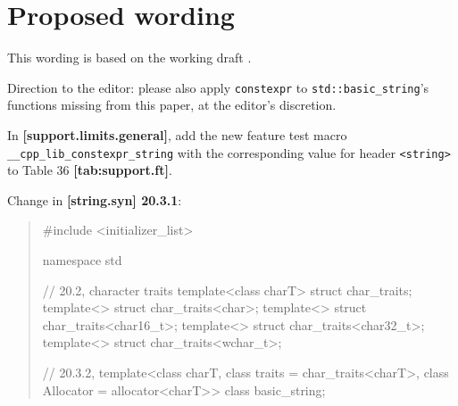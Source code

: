 \documentclass{wg21}
\newcommand{\cc}[1]{\texttt{#1}}
\begin{document}
\section{Proposed wording}
This wording is based on the working draft \cite{N4727}.

Direction to the editor: please also apply \cc{constexpr} to \cc{std::basic_string}'s
functions missing from this paper, at the editor's discretion.

In \textbf{[support.limits.general]}, add the new feature test macro
\cc{__cpp_lib_constexpr_string} with the corresponding value for header
\cc{<string>} to Table 36 \textbf{[tab:support.ft]}.

Change in \textbf{[string.syn] 20.3.1}:
\begin{quote}
\begin{codeblock}
#include <initializer_list>

namespace std {
  // 20.2, character traits
  template<class charT> struct char_traits;
  template<> struct char_traits<char>;
  template<> struct char_traits<char16_t>;
  template<> struct char_traits<char32_t>;
  template<> struct char_traits<wchar_t>;

  // 20.3.2, 
  template<class charT, class traits = char_traits<charT>, class Allocator = allocator<charT>>
    class basic_string;

}
\end{codeblock}
\end{quote}
\end{document}

